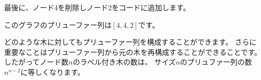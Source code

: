 最後に、ノード4を削除しノード2をコードに追加します。
\begin{center}
\end{center}

このグラフのプリューファー列は$[4,4,2]$です。

どのような木に対してもプリューファー列を構成することができます。
さらに重要なことはプリューファー列から元の木を再構成することができることです。
したがってノード数$n$のラベル付き木の数は、
サイズ$n$のプリュファー列の数$n^{n-2}$に等しくなります。
